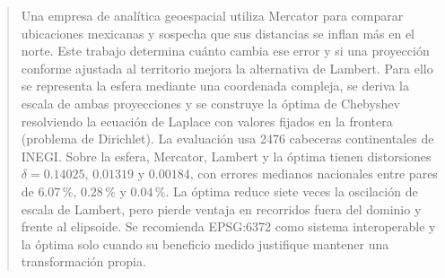 \begin{abstract}
Una empresa de analítica geoespacial utiliza Mercator para comparar ubicaciones mexicanas y sospecha que sus distancias se inflan más en el norte. Este trabajo determina cuánto cambia ese error y si una proyección conforme ajustada al territorio mejora la alternativa de Lambert. Para ello se representa la esfera mediante una coordenada compleja, se deriva la escala de ambas proyecciones y se construye la óptima de Chebyshev resolviendo la ecuación de Laplace con valores fijados en la frontera (problema de Dirichlet). La evaluación usa 2476 cabeceras continentales de INEGI. Sobre la esfera, Mercator, Lambert y la óptima tienen distorsiones $\delta=0.14025$, $0.01319$ y $0.00184$, con errores medianos nacionales entre pares de $6.07\,\%$, $0.28\,\%$ y $0.04\,\%$. La óptima reduce siete veces la oscilación de escala de Lambert, pero pierde ventaja en recorridos fuera del dominio y frente al elipsoide. Se recomienda EPSG:6372 como sistema interoperable y la óptima solo cuando su beneficio medido justifique mantener una transformación propia.
\end{abstract}
